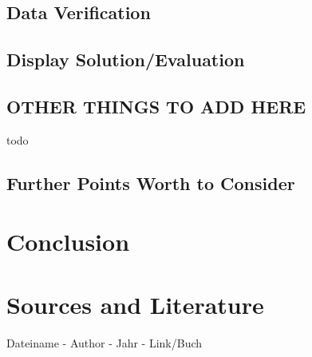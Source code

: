 \documentclass[portrait,a4paper]{article}
\begin{document}
	\subsection{Data Verification}
		
		
	\subsection{Display Solution/Evaluation}
		
					
	\subsection{OTHER THINGS TO ADD HERE}
		todo\\
	\subsection{Further Points Worth to Consider}
			

\section{Conclusion}
	
	

\section{Sources and Literature}

	
 	Dateiname - Author - Jahr - Link/Buch\\
		
	


\clearpage

\end{document}

